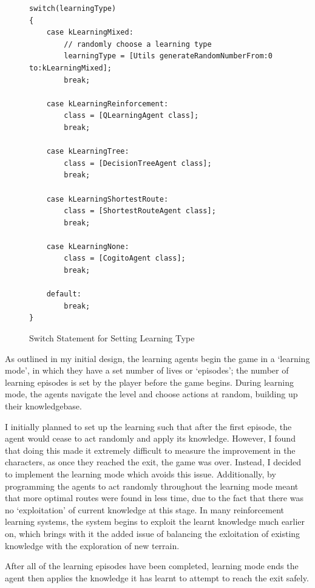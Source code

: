 \documentclass[a4paper,oneside]{report}
\begin{document}
\begin{figure}[h!]
\begin{lstlisting}
switch(learningType) 
{                
	case kLearningMixed:
    	// randomly choose a learning type
        learningType = [Utils generateRandomNumberFrom:0 to:kLearningMixed]; 
        break;
                
    case kLearningReinforcement:
        class = [QLearningAgent class];
        break;
                
    case kLearningTree:
        class = [DecisionTreeAgent class];
        break;
                
    case kLearningShortestRoute:
        class = [ShortestRouteAgent class];
        break;
         
    case kLearningNone:
        class = [CogitoAgent class];
        break;
                
    default:
        break;
}
\end{lstlisting}
\caption{Switch Statement for Setting Learning Type}
\end{figure}

As outlined in my initial design, the learning agents begin the game in a `learning mode', in which they have a set number of lives or `episodes'; the number of learning episodes is set by the player before the game begins. During learning mode, the agents navigate the level and choose actions at random, building up their knowledgebase. 

I initially planned to set up the learning such that after the first episode, the agent would cease to act randomly and apply its knowledge. However, I found that doing this made it extremely difficult to measure the improvement in the characters, as once they reached the exit, the game was over. Instead, I decided to implement the learning mode which avoids this issue. Additionally, by programming the agents to act randomly throughout the learning mode meant that more optimal routes were found in less time, due to the fact that there was no `exploitation' of current knowledge at this stage. In many reinforcement learning systems, the system begins to exploit the learnt knowledge much earlier on, which brings with it the added issue of balancing the exloitation of existing knowledge with the exploration of new terrain. 

After all of the learning episodes have been completed, learning mode ends the agent then applies the knowledge it has learnt to attempt to reach the exit safely.
\end{document}
